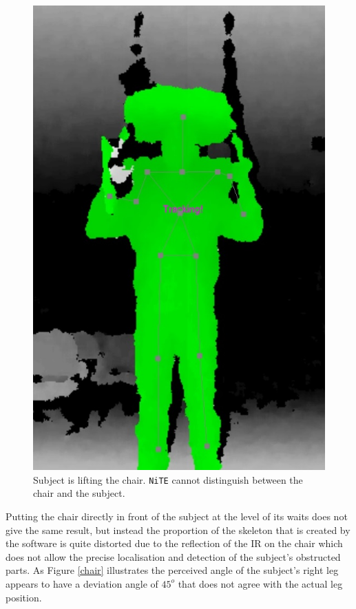 \documentclass[11pt,a4paper]{article}
\begin{document}
\begin{figure}[H]
\center
\includegraphics[scale=0.2]{Head_Chair.jpg} 
\caption{Subject is lifting the chair. \texttt{NiTE} cannot distinguish between the chair and the subject.}
\label{lifting_chair}
\end{figure}

\noindent
Putting the chair directly in front of the subject at the level of its waits does not give the same result, but instead the proportion of the skeleton that is created by the software is quite distorted due to the reflection of the IR on the chair which does not allow the precise localisation and detection of the subject's obstructed parts. As Figure \ref{chair} illustrates the perceived angle of the subject's right leg appears to have a deviation angle of $45^o$ that does not agree with the actual leg position.
\end{document}
